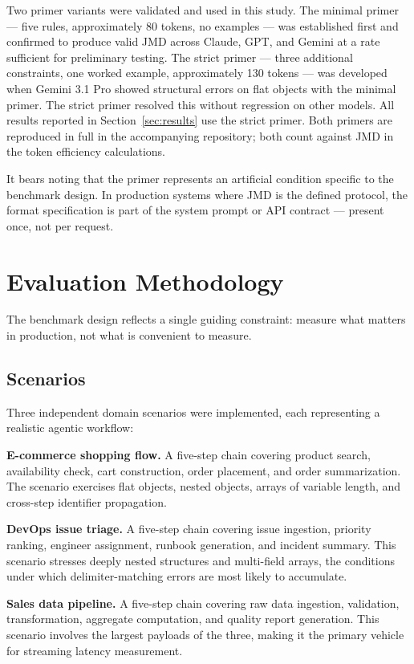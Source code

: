 \documentclass[11pt]{article}
\begin{document}
Two primer variants were validated and used in this study. The minimal primer --- five rules, approximately 80 tokens, no examples --- was established first and confirmed to produce valid JMD across Claude, GPT, and Gemini at a rate sufficient for preliminary testing. The strict primer --- three additional constraints, one worked example, approximately 130 tokens --- was developed when Gemini 3.1 Pro showed structural errors on flat objects with the minimal primer. The strict primer resolved this without regression on other models. All results reported in Section~\ref{sec:results} use the strict primer. Both primers are reproduced in full in the accompanying repository; both count against JMD in the token efficiency calculations.

It bears noting that the primer represents an artificial condition specific to the benchmark design. In production systems where JMD is the defined protocol, the format specification is part of the system prompt or API contract --- present once, not per request.

\section{Evaluation Methodology}

The benchmark design reflects a single guiding constraint: measure what matters in production, not what is convenient to measure.

\subsection{Scenarios}

Three independent domain scenarios were implemented, each representing a realistic agentic workflow:

\textbf{E-commerce shopping flow.} A five-step chain covering product search, availability check, cart construction, order placement, and order summarization. The scenario exercises flat objects, nested objects, arrays of variable length, and cross-step identifier propagation.

\textbf{DevOps issue triage.} A five-step chain covering issue ingestion, priority ranking, engineer assignment, runbook generation, and incident summary. This scenario stresses deeply nested structures and multi-field arrays, the conditions under which delimiter-matching errors are most likely to accumulate.

\textbf{Sales data pipeline.} A five-step chain covering raw data ingestion, validation, transformation, aggregate computation, and quality report generation. This scenario involves the largest payloads of the three, making it the primary vehicle for streaming latency measurement.
\end{document}
